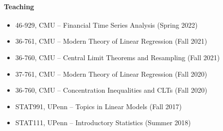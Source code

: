 \documentclass[10pt]{article}
\numberwithin{myalgctr}{section}
\begin{document}
\paragraph{Teaching}
\begin{itemize}\itemsep0em
\item 46-929, CMU -- Financial Time Series Analysis (Spring 2022)
\item 36-761, CMU -- Modern Theory of Linear Regression (Fall 2021)
\item 36-760, CMU -- Central Limit Theorems and Resampling (Fall 2021)
\item 37-761, CMU -- Modern Theory of Linear Regression (Fall 2020)
\item 36-760, CMU -- Concentration Inequalities and CLTs (Fall 2020)
\item STAT991, UPenn -- Topics in Linear Models (Fall 2017)
\item STAT111, UPenn -- Introductory Statistics (Summer 2018)
\end{itemize}
\end{document}
